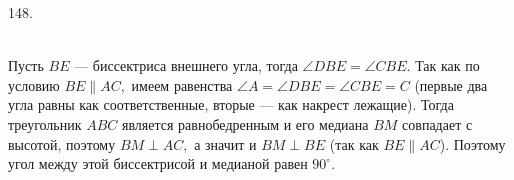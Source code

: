 148. \begin{figure}[ht!]
\end{figure}\\
Пусть $BE$ --- биссектриса внешнего угла, тогда $\angle DBE=\angle CBE.$ Так как по условию $BE\parallel AC,$ имеем равенства $\angle A=\angle DBE=\angle CBE=C$ (первые два угла равны как соответственные, вторые --- как накрест лежащие). Тогда треугольник $ABC$ является равнобедренным и его медиана $BM$ совпадает с высотой, поэтому $BM\perp AC,$ а значит и $BM\perp BE$ (так как $BE\parallel AC$). Поэтому угол между этой биссектрисой и медианой равен $90^\circ.$\newpage\noindent

